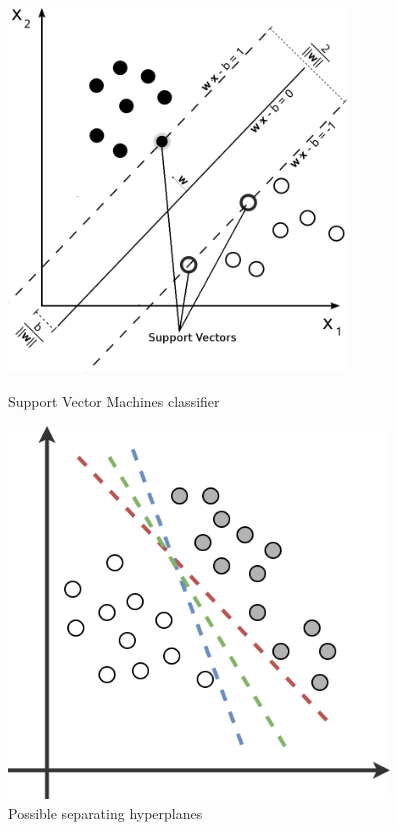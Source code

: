 \documentclass[11pt,a4paper]{article}
\begin{document}
\begin{figure}[!h]
	\begin{minipage}[t]{0.5\linewidth}
		\centering
		\includegraphics[width=0.8\textwidth]{img/SVMPlot2.png}
		\caption{Support Vector Machines classifier}
		\label{f1}
	\end{minipage}
	\hspace{0.1cm}
	\begin{minipage}[t]{0.5\linewidth} 
		\centering
		\includegraphics[width=0.9\textwidth]{img/separating-lines.png}
		\caption{Possible separating hyperplanes}
		\label{f2}
	\end{minipage}        
\end{figure} 
\end{document}
